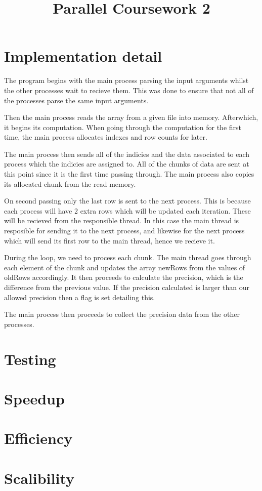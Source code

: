 \documentclass{article}
\title{Parallel Coursework 2}
\begin{document}
\maketitle

\section{Implementation detail}

The program begins with the main process parsing the input arguments whilst the other processes wait to recieve them. This was done to ensure that not all of the processes parse the same input arguments.

Then the main process reads the array from a given file into memory. Afterwhich, it begins its computation. When going through the computation for the first time, the main process allocates indexes and row counts for later.

The main process then sends all of the indicies and the data associated to each process which the indicies are assigned to. All of the chunks of data are sent at this point since it is the first time passing through. The main process also copies its allocated chunk from the read memory.

On second passing only the last row is sent to the next process. This is because each process will have 2 extra rows which will be updated each iteration. These will be recieved from the responsible thread. In this case the main thread is resposible for sending it to the next process, and likewise for the next process which will send its first row to the main thread, hence we recieve it.

During the loop, we need to process each chunk. The main thread goes through each element of the chunk and updates the array newRows from the values of oldRows accordingly. It then proceeds to calculate the precision, which is the difference from the previous value. If the precision calculated is larger than our allowed precision then a flag is set detailing this.

The main process then proceeds to collect the precision data from the other processes. 

\section{Testing}


\section{Speedup}


\section{Efficiency}


\section{Scalibility}
\end{document}
